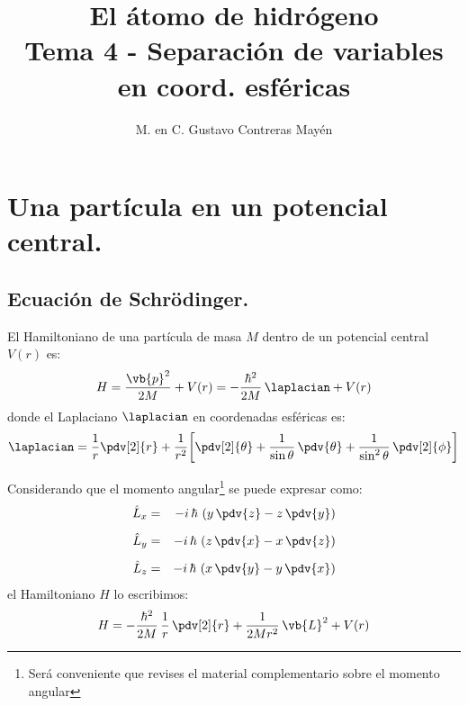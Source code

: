 
\usepackage{../Estilos/ColoresLatex}
\title{El átomo de hidrógeno \\ \large {Tema 4 - Separación de variables en coord. esféricas}\vspace{-3ex}}

\author{M. en C. Gustavo Contreras Mayén}
\date{ }

\pagestyle{fancy}
\fancyhf{}
\lhead{\leftmark}
\rfoot{\thepage}
\setlength{\headheight}{16pt}%



\maketitle
\fontsize{14}{14}\selectfont
\tableofcontents
\newpage


\section{Una partícula en un potencial central.}
\subsection{Ecuación de Schrödinger.}

El Hamiltoniano de una partícula de masa $M$ dentro de un potencial central $V (r)$ es:
\begin{align}
H = \dfrac{\vb{p}^{2}}{2 M} + V (r) = - \dfrac{\hbar^{2}}{2 M} \, \laplacian + V (r)
\label{eq:ecuacion_08_01}
\end{align}
donde el Laplaciano $\laplacian$ en coordenadas esféricas es:
\begin{align}
\laplacian = \dfrac{1}{r} \pdv[2]{r} + \dfrac{1}{r^{2}} \bigg[ \pdv[2]{\theta} + \dfrac{1}{\sin \theta} \, \pdv{\theta} + \dfrac{1}{\sin^{2} \theta} \, \pdv[2]{\phi} \bigg]
\label{eq:ecuacion_08_02}
\end{align}

Considerando que el momento angular\footnote{Será conveniente que revises el material complementario sobre el momento angular} se puede expresar como:
\begin{align}
\begin{aligned}
\hat{L}_{x} &=& - i \, \hbar \, \left( y \, \pdv{z} - z \, \pdv{y} \right) \\[0.5em] 
\hat{L}_{y} &=& - i \, \hbar \, \left( z \, \pdv{x} - x \, \pdv{z} \right) \\[0.5em] 
\hat{L}_{z} &=& - i \, \hbar \, \left( x \, \pdv{y} - y \, \pdv{x} \right)
\end{aligned}
\label{eq:ecuacion_01_03a}
\end{align}
el Hamiltoniano $H$ lo escribimos:
\begin{align}
H = - \dfrac{\hbar^{2}}{2 M} \, \dfrac{1}{r} \, \pdv[2]{r} + \dfrac{1}{2 M r^{2}} \, \vb{L}^{2} + V (r)
\label{eq:ecuacion_08_03}
\end{align}


